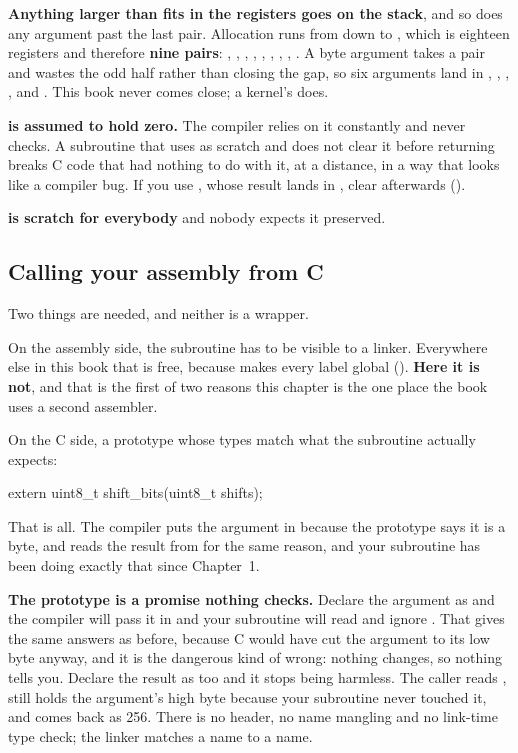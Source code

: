 \textbf{Anything larger than fits in the registers goes on the stack}, and so does any argument
past the last pair. Allocation runs from  down to , which is eighteen registers
and therefore \textbf{nine pairs}: , , , ,
, , , , . A byte argument takes
a pair and wastes the odd half rather than closing the gap, so six  arguments land in
, , , ,  and . This book never comes
close; a kernel's  does.

\textbf{ is assumed to hold zero.} The compiler relies on it constantly and never checks.
A subroutine that uses  as scratch and does not clear it before returning breaks C code
that had nothing to do with it, at a distance, in a way that looks like a compiler bug. If you use
, whose result lands in , clear  afterwards ().

\textbf{ is scratch for everybody} and nobody expects it preserved.

\subsection{Calling your assembly from C}
\label{c6:sec:asmfromc}
Two things are needed, and neither is a wrapper.

On the assembly side, the subroutine has to be visible to a linker. Everywhere else in this book
that is free, because  makes every label global (). \textbf{Here it
is not}, and that is the first of two reasons this chapter is the one place the book uses a second
assembler.

On the C side, a prototype whose types match what the subroutine actually expects:

\begin{ccode}
extern uint8_t shift_bits(uint8_t shifts);
\end{ccode}

That is all. The compiler puts the argument in  because the prototype says it is a byte,
and reads the result from  for the same reason, and your subroutine has been doing
exactly that since Chapter~1.

\textbf{The prototype is a promise nothing checks.} Declare the argument as  and the
compiler will pass it in  and your subroutine will read  and ignore
. That gives the same answers as before, because C would have cut the argument to its low
byte anyway, and it is the dangerous kind of wrong: nothing changes, so nothing tells you. Declare
the result as  too and it stops being harmless. The caller reads ,
 still holds the argument's high byte because your subroutine never touched it, and
 comes back as 256. There is no header, no name mangling and no link-time
type check; the linker matches a name to a name.

